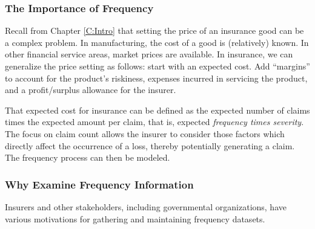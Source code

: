 \documentclass[]{book}
\theoremstyle{definition}
\theoremstyle{definition}
\theoremstyle{definition}
\theoremstyle{remark}
\begin{document}
\subsubsection{The Importance of
Frequency}\label{S:the-importance-of-frequency}

Recall from Chapter \ref{C:Intro} that setting the price of an insurance
good can be a complex problem. In manufacturing, the cost of a good is
(relatively) known. In other financial service areas, market prices are
available. In insurance, we can generalize the price setting as follows:
start with an expected cost. Add ``margins'' to account for the
product's riskiness, expenses incurred in servicing the product, and a
profit/surplus allowance for the insurer.

That expected cost for insurance can be defined as the expected number
of claims times the expected amount per claim, that is, expected
\emph{frequency times severity}. The focus on claim count allows the
insurer to consider those factors which directly affect the occurrence
of a loss, thereby potentially generating a claim. The frequency process
can then be modeled.

\subsubsection{Why Examine Frequency
Information}\label{S:why-examine-frequency-information}

Insurers and other stakeholders, including governmental organizations,
have various motivations for gathering and maintaining frequency
datasets.
\end{document}
